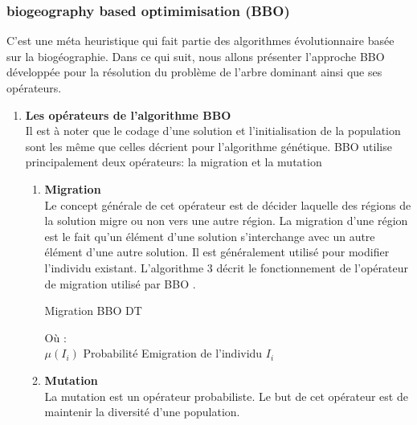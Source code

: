 \subsubsection{biogeography based optimimisation (BBO)}
C’est une méta heuristique qui fait partie des algorithmes évolutionnaire basée sur la biogéographie. Dans ce qui suit, nous allons présenter l’approche BBO développée pour la résolution du problème de l’arbre dominant ainsi que ses opérateurs.

\begin{enumerate}
	\item \textbf{Les opérateurs de l’algorithme BBO}\\
	Il est à noter que le codage d’une solution et l’initialisation de la population sont les même  que celles décrient pour l’algorithme génétique. BBO utilise principalement deux opérateurs: la migration et la mutation 
	\begin{enumerate}[label=\alph*)]
		\item \textbf{Migration}\\
		Le concept générale de cet opérateur est de décider laquelle des régions de la solution migre ou non vers une autre région. La migration d’une région est le fait qu’un élément d’une solution s’interchange avec un autre élément d’une autre solution. Il est généralement utilisé pour modifier l’individu existant. L’algorithme 3 décrit le fonctionnement de l’opérateur de migration utilisé par BBO .\\
		
\begin{algorithm}[H]
\caption{Migration BBO DT}
\SetAlgoLined
\DontPrintSemicolon
\large


\end{algorithm}		

Où :\\
$\mu(I_i)$ Probabilité Emigration de l'individu $I_i$ \\
		
	\item \textbf{Mutation}\\
	La mutation est un opérateur probabiliste. Le but de cet opérateur est de maintenir la diversité d’une population.\\
	

\end{enumerate}
\end{enumerate}
